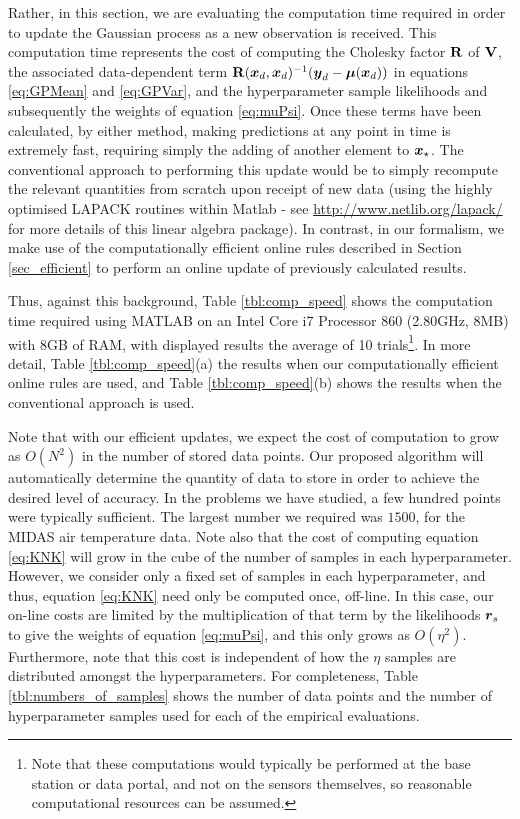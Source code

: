 \documentclass{acmtrans2m}
\begin{document}
Rather, in this section, we are evaluating the computation time required in order to update the Gaussian process as a new observation is received. This computation time represents the cost of computing the Cholesky factor $\mathbf{R}$ of $\mathbf{V}$, the associated data-dependent term $\mathbf{R}(\boldsymbol{x}_d,\boldsymbol{x}_d)^{-1}(\boldsymbol{y}_d-\boldsymbol{\mu}(\boldsymbol{x}_d))$ in equations \eqref{eq:GPMean} and \eqref{eq:GPVar}, and the hyperparameter sample likelihoods and subsequently the weights of equation \eqref{eq:muPsi}. Once these terms have been calculated, by either method, making predictions at any point in time is extremely fast, requiring simply the adding of another element to $\boldsymbol{x}_\star$. The conventional approach to performing this update would be to simply recompute the relevant quantities from scratch upon receipt of new data (using the highly optimised LAPACK routines within Matlab - see \url{http://www.netlib.org/lapack/} for more details of this linear algebra package). In contrast, in our formalism, we make use of the computationally efficient online rules described in Section \ref{sec_efficient} to perform an online update of previously calculated results.  

Thus, against this background, Table \ref{tbl:comp_speed} shows the computation time required using MATLAB on an Intel Core i7 Processor 860 (2.80GHz, 8MB) with 8GB of RAM, with displayed results the average of 10 trials\footnote{Note that these computations would typically be performed at the base station or data portal, and not on the sensors themselves, so reasonable computational resources can be assumed.}. In more detail, Table \ref{tbl:comp_speed}(a) the results when our computationally efficient online rules are used, and Table \ref{tbl:comp_speed}(b) shows the results when the conventional approach is used.

Note that with our efficient updates, we expect the cost of computation to grow as $O(N^2)$ in the number of stored data points. Our proposed algorithm will automatically determine the quantity of data to store in order to achieve the desired level of accuracy. In the problems we have studied, a few hundred points were typically sufficient. The largest number we required was $1500$, for the MIDAS air temperature data. Note also that the cost of computing equation \eqref{eq:KNK} will grow in the cube of the number of samples in each hyperparameter. However, we consider only a fixed set of samples in each hyperparameter, and thus, equation \eqref{eq:KNK} need only be computed once, off-line. In this case, our on-line costs are limited by the multiplication of that term by the likelihoods $\boldsymbol{r}_s$ to give the weights of equation \eqref{eq:muPsi}, and this only grows as $O(\eta^2)$. Furthermore, note that this cost is independent of how the $\eta$ samples are distributed amongst the hyperparameters. For completeness, Table \ref{tbl:numbers_of_samples} shows the number of data points and the number of hyperparameter samples used for each of the empirical evaluations.
\end{document}
